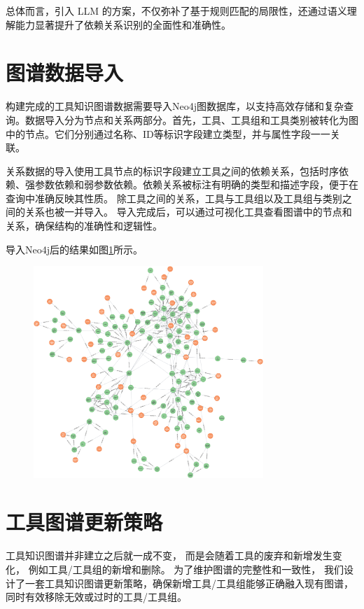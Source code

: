 总体而言，引入 LLM 的方案，不仅弥补了基于规则匹配的局限性，还通过语义理解能力显著提升了依赖关系识别的全面性和准确性。

\section{图谱数据导入}

构建完成的工具知识图谱数据需要导入Neo4j图数据库，以支持高效存储和复杂查询。数据导入分为节点和关系两部分。首先，工具、工具组和工具类别被转化为图中的节点。它们分别通过名称、ID等标识字段建立类型，并与属性字段一一关联。

关系数据的导入使用工具节点的标识字段建立工具之间的依赖关系，包括时序依赖、强参数依赖和弱参数依赖。依赖关系被标注有明确的类型和描述字段，便于在查询中准确反映其性质。
除工具之间的关系，工具与工具组以及工具组与类别之间的关系也被一并导入。
导入完成后，可以通过可视化工具查看图谱中的节点和关系，确保结构的准确性和逻辑性。

导入Neo4j后的结果如图\ref{fig:ch3-neo4j}所示。

\begin{figure}[H]
    \vspace{1em}
    \centering
    \setlength{\abovecaptionskip}{10pt} %
    \includegraphics[height=8cm]{../assets/Neo4j工具图1126-150nodes.png}
    \label{fig:ch3-neo4j}
\end{figure}

\section{工具图谱更新策略}

工具知识图谱并非建立之后就一成不变，
而是会随着工具的废弃和新增发生变化，
例如工具/工具组的新增和删除。
为了维护图谱的完整性和一致性，
我们设计了一套工具知识图谱更新策略，确保新增工具/工具组能够正确融入现有图谱，同时有效移除无效或过时的工具/工具组。

